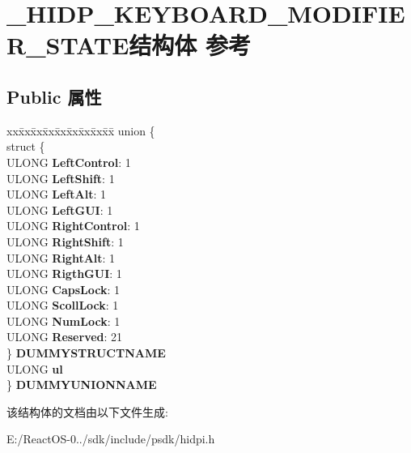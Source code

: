 \hypertarget{struct___h_i_d_p___k_e_y_b_o_a_r_d___m_o_d_i_f_i_e_r___s_t_a_t_e}{}\section{\+\_\+\+H\+I\+D\+P\+\_\+\+K\+E\+Y\+B\+O\+A\+R\+D\+\_\+\+M\+O\+D\+I\+F\+I\+E\+R\+\_\+\+S\+T\+A\+T\+E结构体 参考}
\label{struct___h_i_d_p___k_e_y_b_o_a_r_d___m_o_d_i_f_i_e_r___s_t_a_t_e}
\subsection*{Public 属性}
\begin{DoxyCompactItemize}
\item 
\mbox{\label{struct___h_i_d_p___k_e_y_b_o_a_r_d___m_o_d_i_f_i_e_r___s_t_a_t_e_a41d38ed59900c019608551a1e861324f}} 
\begin{tabbing}
xx\=xx\=xx\=xx\=xx\=xx\=xx\=xx\=xx\=\kill
union \{\\
\>struct \{\\
\>\>ULONG {\bfseries LeftControl}: 1\\
\>\>ULONG {\bfseries LeftShift}: 1\\
\>\>ULONG {\bfseries LeftAlt}: 1\\
\>\>ULONG {\bfseries LeftGUI}: 1\\
\>\>ULONG {\bfseries RightControl}: 1\\
\>\>ULONG {\bfseries RightShift}: 1\\
\>\>ULONG {\bfseries RightAlt}: 1\\
\>\>ULONG {\bfseries RigthGUI}: 1\\
\>\>ULONG {\bfseries CapsLock}: 1\\
\>\>ULONG {\bfseries ScollLock}: 1\\
\>\>ULONG {\bfseries NumLock}: 1\\
\>\>ULONG {\bfseries Reserved}: 21\\
\>\} {\bfseries DUMMYSTRUCTNAME}\\
\>ULONG {\bfseries ul}\\
\} {\bfseries DUMMYUNIONNAME}\\

\end{tabbing}\end{DoxyCompactItemize}


该结构体的文档由以下文件生成\+:\begin{DoxyCompactItemize}
\item 
E\+:/\+React\+O\+S-\/0../sdk/include/psdk/hidpi.\+h\end{DoxyCompactItemize}
